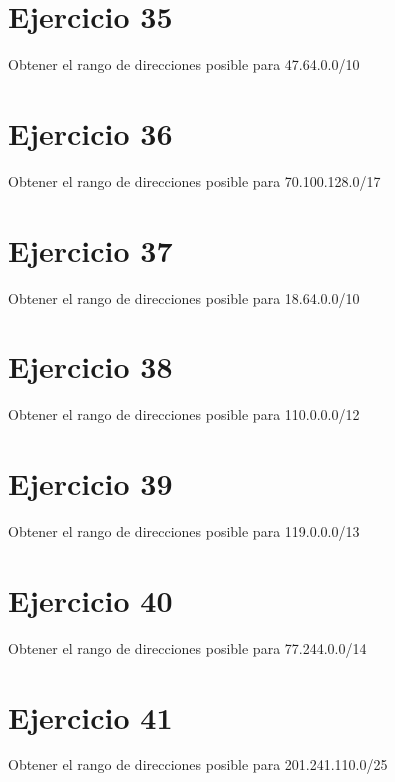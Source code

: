 \documentclass[letterpaper,10pt,spanish]{sphinxmanual}
\begin{document}
\section{Ejercicio 35}
\label{\detokenize{t2_integracion_elementos/ejercicios_subredes_ipv4/rangos_direcciones:ejercicio-35}}
\sphinxAtStartPar
Obtener el rango de direcciones posible para 47.64.0.0/10


\section{Ejercicio 36}
\label{\detokenize{t2_integracion_elementos/ejercicios_subredes_ipv4/rangos_direcciones:ejercicio-36}}
\sphinxAtStartPar
Obtener el rango de direcciones posible para 70.100.128.0/17


\section{Ejercicio 37}
\label{\detokenize{t2_integracion_elementos/ejercicios_subredes_ipv4/rangos_direcciones:ejercicio-37}}
\sphinxAtStartPar
Obtener el rango de direcciones posible para 18.64.0.0/10


\section{Ejercicio 38}
\label{\detokenize{t2_integracion_elementos/ejercicios_subredes_ipv4/rangos_direcciones:ejercicio-38}}
\sphinxAtStartPar
Obtener el rango de direcciones posible para 110.0.0.0/12


\section{Ejercicio 39}
\label{\detokenize{t2_integracion_elementos/ejercicios_subredes_ipv4/rangos_direcciones:ejercicio-39}}
\sphinxAtStartPar
Obtener el rango de direcciones posible para 119.0.0.0/13


\section{Ejercicio 40}
\label{\detokenize{t2_integracion_elementos/ejercicios_subredes_ipv4/rangos_direcciones:ejercicio-40}}
\sphinxAtStartPar
Obtener el rango de direcciones posible para 77.244.0.0/14


\section{Ejercicio 41}
\label{\detokenize{t2_integracion_elementos/ejercicios_subredes_ipv4/rangos_direcciones:ejercicio-41}}
\sphinxAtStartPar
Obtener el rango de direcciones posible para 201.241.110.0/25
\end{document}
